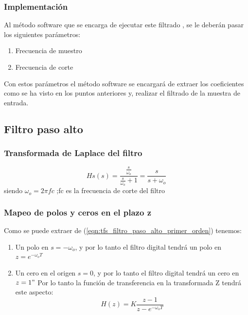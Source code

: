 \documentclass[titlepage]{article}
\begin{document}
\subsubsection{Implementación}
Al método software que se encarga de ejecutar este filtrado , se le deberán pasar los siguientes parámetros:
\begin{enumerate}
\item Frecuencia de muestro 
\item Frecuencia de corte
\end{enumerate}
Con estos parámetros el método software se encargará de extraer los coeficientes como se ha visto en los puntos anteriores y, realizar el filtrado de la muestra de entrada.





\subsection{Filtro paso alto}
\subsubsection{Transformada de Laplace del filtro}
\begin{equation}
\label{eqn:tfs_filtro_paso_alto_primer_orden} Hs(s)=\frac{\displaystyle\frac{s}{\omega_o}}{\displaystyle\frac{s}{{\omega_o}}+1} = \frac{s}{s+\omega_o}
\end{equation}
\quad siendo ${\omega_o}=2{\pi}fc$ ;fc es la frecuencia de corte del filtro 
\subsubsection{Mapeo de polos y ceros en el plazo z}
Como se puede extraer de (\ref{eqn:tfs_filtro_paso_alto_primer_orden}) tenemos:
\begin{enumerate}
	\item Un polo en $s=-{\omega_o}$, y por lo tanto el filtro digital tendrá un polo en 		$z=e^{-\omega_oT}$ 
	\item Un cero en el origen $s=0$, y por lo tanto el filtro digital tendrá un cero en 		$z=1"$
	Por lo tanto la función de transferencia en la transformada Z tendrá este aspecto:\\
		\begin{equation}
			H(z)=K\frac{z-1}{z-e^{-\omega_oT}} 
		\end{equation}
\end{enumerate}
\end{document}
